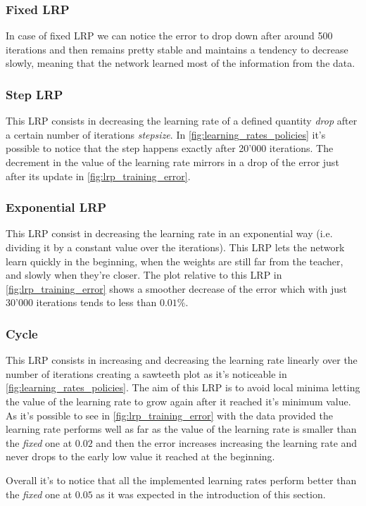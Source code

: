\subsubsection{Fixed LRP}
In case of fixed LRP we can notice the error to drop down after around 500 iterations and then
remains pretty stable and maintains a tendency to decrease slowly, meaning that the network learned most
of the information from the data.

\subsubsection{Step LRP}
This LRP consists in decreasing the learning rate of a defined quantity \textit{drop} after a certain number of iterations
\textit{stepsize}. In \cref{fig:learning_rates_policies} it's possible to notice that the step happens exactly after 20'000 iterations.
The decrement in the value of the learning rate mirrors in a drop of the error just after its update in \cref{fig:lrp_training_error}.

\subsubsection{Exponential LRP}
This LRP consist in decreasing the learning rate in an exponential way (i.e. dividing it by a constant value over the iterations). This
LRP lets the network learn quickly in the beginning, when the weights are still far from the teacher, and slowly when they're closer. The plot
relative to this LRP in \cref{fig:lrp_training_error} shows a smoother decrease of the error which with just 30'000 iterations tends to less than
$0.01\%$.

\subsubsection{Cycle}
This LRP consists in increasing and decreasing the learning rate linearly over the number of iterations creating a sawteeth plot as it's noticeable
in \cref{fig:learning_rates_policies}. The aim of this LRP is to avoid local minima letting the value of the learning rate to grow again after it
reached it's minimum value. As it's possible to see in \cref{fig:lrp_training_error} with the data provided the learning rate performs well as far
as the value of the learning rate is smaller than the \textit{fixed} one at $0.02$ and then the error increases increasing the learning rate and never
drops to the early low value it reached at the beginning.

Overall it's to notice that all the implemented learning rates perform better than the \textit{fixed} one at $0.05$ as it was expected in the introduction of this section.